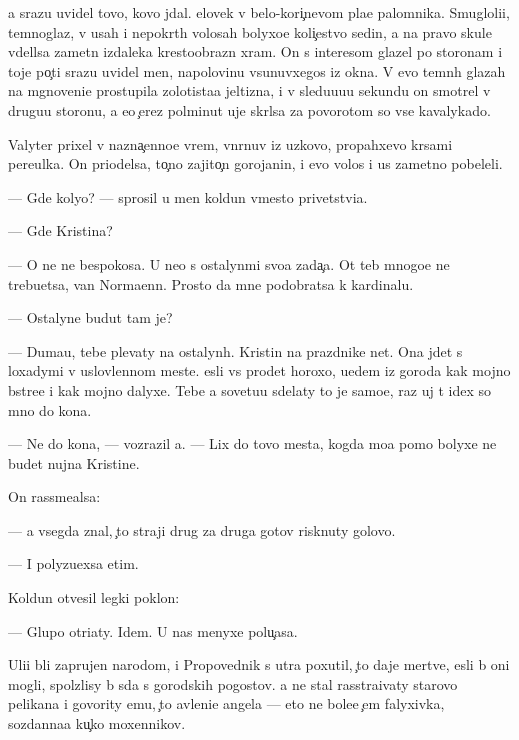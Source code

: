 \documentclass[10pt]{book}
\begin{document}
{\Y}a srazu uvidel tovo, kovo jdal. {\C}elovek v belo-kori{\c}nevom pla{\x}e palomnika. Smugloli{\q}i{\y}, temnoglaz{\yi}{\y}, v usah i nepokr{\yi}t{\yi}h volosah bolyxo{\y}e koli{\c}estvo sedin{\yi}, a na pravo{\y} skule v{\yi}del{\ia}lsa zametn{\yi}{\y} izdaleka krestoobrazn{\yi}{\y} xram. On s interesom glazel po storonam i toje po{\c}ti srazu uvidel men{\ia}, napolovinu v{\yi}sunuvxegos{\ia} iz okna. V {\y}evo temn{\yi}h glazah na mgnoveni{\y}e prostupila zolotista{\y}a jeltizna, i v sledu{\y}u{\x}u{\y}u sekundu on smotrel v drugu{\y}u storonu, a {\y}e{\x}o {\c}erez polminut{\yi} uje skr{\yi}lsa za povorotom so vse{\y} kavalykado{\y}.



Valyter prixel v nazna{\c}enno{\y}e vrem{\ia}, v{\yi}n{\yi}rnuv iz uzkovo, propahxevo kr{\yi}sami pereulka. On priodelsa, to{\c}no zajito{\c}n{\yi}{\y} gorojanin, i {\y}evo volos{\yi} i us{\yi} zametno pobeleli.

— Gde koly{\q}o? — sprosil u men{\ia} koldun vmesto privetstvi{\y}a.

— Gde Kristina?

— O ne{\y} ne bespoko{\y}sa. U ne{\y}o s ostalyn{\yi}mi svo{\y}a zada{\c}a. Ot teb{\ia} mnogo{\y}e ne trebu{\y}etsa, van Norma{\y}enn. Prosto da{\y} mne podobratsa k kardinalu.

— Ostalyn{\yi}{\y}e budut tam je?

— Duma{\y}u, tebe plevaty na ostalyn{\yi}h. Kristin{\yi} na prazdnike net. Ona jdet s loxadymi v uslovlennom meste. {\Y}esli vs{\e} pro{\y}det horoxo, u{\y}edem iz goroda kak mojno b{\yi}stre{\y}e i kak mojno dalyxe. Tebe {\y}a sovetu{\y}u sdelaty to je samo{\y}e, raz uj t{\yi} idex so mno{\y} do kon{\q}a.

— Ne do kon{\q}a, — vozrazil {\y}a. — Lix do tovo mesta, kogda mo{\y}a pomo{\x} bolyxe ne budet nujna Kristine.

On rassme{\y}alsa:

— {\Y}a vsegda znal, {\c}to straji drug za druga gotov{\yi} risknuty golovo{\y}.

— I polyzu{\y}exsa etim.

Koldun otvesil legki{\y} poklon:

— Glupo otri{\q}aty. Idem. U nas menyxe polu{\c}asa.

Uli{\q}i b{\yi}li zaprujen{\yi} narodom, i Propovednik s utra poxutil, {\c}to daje mertv{\yi}{\y}e, {\y}esli b{\yi} oni mogli, spolzlisy b{\yi} s{\iu}da s gorodskih pogostov. {\Y}a ne stal rasstra{\y}ivaty starovo pelikana i govority {\y}emu, {\c}to {\y}avleni{\y}e angela — eto ne bole{\y}e {\c}em falyxivka, sozdanna{\y}a ku{\c}ko{\y} moxennikov.
\end{document}

